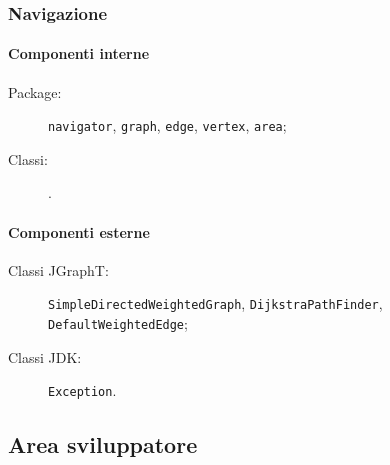 \documentclass[../ManualeSviluppatore.tex]{subfiles}
\begin{document}
			
			
		
		\subsubsection{Navigazione}
		
			\paragraph*{Componenti interne}
			\begin{description}
				\item[Package:] \verb|navigator|, \verb|graph|, \verb|edge|, \verb|vertex|, \verb|area|;
				\item[Classi:] \verb||.
			\end{description}
			
			\paragraph*{Componenti esterne}
			\begin{description}
				\item[Classi JGraphT:] \verb|SimpleDirectedWeightedGraph|, \verb|DijkstraPathFinder|, \verb|DefaultWeightedEdge|;
				\item[Classi JDK:] \verb|Exception|.
			\end{description}

			
	
	\subsection{Area sviluppatore}
\end{document}
